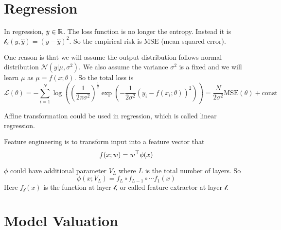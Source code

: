 \section{Regression}

In regression, $y \in \mathbb{R}$. The loss function is no longer the entropy. Instead it is $\mathcal{l}_2 (y, \hat{y}) = (y - \hat{y})^2$. So the empirical risk is $\mathrm{MSE}$ (mean squared error).

\begin{theorem}
    One reason is that we will assume the output distribution follows normal distribution $\mathcal{N}(y|\mu,\sigma^2)$. We also assume the variance $\sigma^2$ is a fixed and we will learn $\mu$ as $\mu = f(x;\theta)$. So the total loss is
\begin{equation}
    \mathcal{L}(\theta) = - \sum_{i=1}^N \log \left( \left(\frac{1}{2\pi \sigma^2}\right)^{\frac{1}{2}} \exp\left(- \frac{1}{2 \sigma^2} \left( y_i - f(x_i ; \theta) \right)^2 \right) \right) = \frac{N}{2\sigma^2} \mathrm{MSE}(\theta) + \mathrm{const}
\end{equation}
\end{theorem}




Affine transformation could be used in regression, which is called linear regression.

\begin{definition}
    Feature engineering is to transform input into a feature vector that 
    \begin{equation}
        f(x;w) = {w}^\top \phi(x)
    \end{equation}
\end{definition}

\begin{definition}\label{multi_layer_percepton}
    $\phi$ could have additional parameter $V_L$ where $L$ is the total number of layers. So
    \begin{equation}
        \phi(x;V_L) = f_L \circ f_{L-1} \circ \cdots f_1 (x)
    \end{equation}
    Here $f_{\mathcal{l}}(x)$ is the function at layer $\mathcal{l}$, or called feature extractor at layer $\mathcal{l}$.
\end{definition}


\section{Model Valuation}

